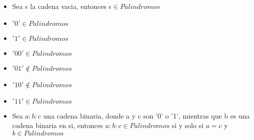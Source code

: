 \documentclass[12pt, fleqn]{article}                            %
\theoremstyle{break}                                            %
\begin{document}
    \begin{itemize}
        \item Sea $\epsilon$ la cadena vacia, entonces $\epsilon \in Palindromos$
        \item $'0' \in Palindromos$
        \item $'1' \in Palindromos$
        \item $'00' \in Palindromos$
        \item $'01' \notin Palindromos$
        \item $'10' \notin Palindromos$
        \item $'11' \in Palindromos$
        \item Sea $a:b:c$ una cadena binaria, donde a y c son '0' o '1', mientras
        que b es una cadena binaria en si, entonces $a:b:c \in Palindromos$ si y solo
        si $a = c$ y $b \in Palindromos$
    \end{itemize}



                
\end{document}
